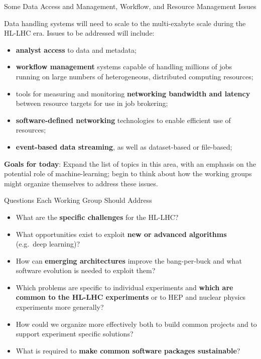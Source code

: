 \documentclass[compress,10]{beamer}
\begin{document}
\begin{frame}{Some Data Access and Management, Workflow,
and Resource Management Issues}{}
{\footnotesize
Data handling systems will need to scale to the multi-exabyte scale during
the HL-LHC era.
Issues to be addressed will include:
\begin{itemize}
 \item
  \textcolor{brickred}{\bf analyst access} to data and metadata;
 \item
  \textcolor{brickred}{\bf workflow management}
   systems capable of handling millions of jobs
  running on large numbers of heterogeneous, distributed computing resources;
 \item
  tools for measuring and monitoring \textcolor{brickred}{\bf networking 
  bandwidth and latency} between
  resource targets for use in job brokering;
 \item
  \textcolor{brickred}{\bf
  software-defined networking} technologies to enable efficient use of 
  resources;
 \item
  \textcolor{brickred}{\bf event-based data streaming}, 
   as well as dataset-based or file-based;
\end{itemize}
\vskip 0.1in
\noindent
\textcolor{brickred}{\bf Goals for today}: 
Expand the list of topics in this area, with an emphasis
on the potential role of machine-learning; 
begin to think about how
the working groups might organize themselves to address these issues.
}  %

\end{frame}
\begin{frame}{
Questions Each Working Group Should Address}{}
{\footnotesize
\begin{itemize}
\item
  What are the \textcolor{brickred}{\bf specific challenges} for the
  HL-LHC?
\item
  What opportunities exist to exploit \textcolor{brickred}{\bf new or advanced
  algorithms} (e.g.\ deep learning)?
\item
  How can \textcolor{brickred}{\bf emerging architectures}
   improve the bang-per-buck and what
  software evolution is needed to exploit them?
\item
  Which problems are specific to individual experiments and 
  \textcolor{brickred}{\bf which
  are common to the HL-LHC experiments} or to HEP
  and nuclear physics experiments
  more generally?
\item
  How could we organize more effectively both to build common projects and to support experiment specific solutions?
\item
  What is required to 
  \textcolor{brickred}{\bf make common software packages sustainable}?
\end{itemize}
}  %

\end{frame}
\end{document}
